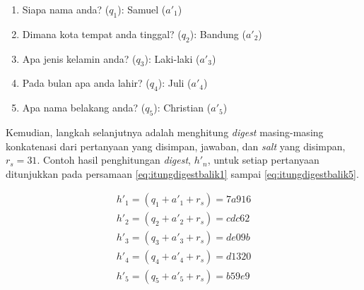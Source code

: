 \begin{enumerate}[itemsep=0mm]
	\item Siapa nama anda? (\begin{math}q_1\end{math}): Samuel (\begin{math}a'_1\end{math})
	\item Dimana kota tempat anda tinggal? (\begin{math}q_2\end{math}): Bandung (\begin{math}a'_2\end{math})
	\item Apa jenis kelamin anda? (\begin{math}q_3\end{math}): Laki-laki (\begin{math}a'_3\end{math})
	\item Pada bulan apa anda lahir? (\begin{math}q_4\end{math}): Juli (\begin{math}a'_4\end{math})
	\item Apa nama belakang anda? (\begin{math}q_5\end{math}): Christian (\begin{math}a'_5\end{math})
\end{enumerate}

Kemudian, langkah selanjutnya adalah menghitung \textit{digest} masing-masing konkatenasi dari pertanyaan yang disimpan, jawaban, dan \textit{salt} yang disimpan, \begin{math}r_s=31\end{math}. Contoh hasil penghitungan \textit{digest}, \begin{math}h'_n\end{math}, untuk setiap pertanyaan ditunjukkan pada persamaan \ref{eq:itungdigestbalik1} sampai \ref{eq:itungdigestbalik5}.

\begin{gather}
	h'_1 = (q_1 + a'_1 + r_s) = 7a916 \label{eq:itungdigestbalik1} \\
	h'_2 = (q_2 + a'_2 + r_s) = cdc62 \label{eq:itungdigestbalik2} \\
	h'_3 = (q_3 + a'_3 + r_s) = de09b \label{eq:itungdigestbalik3} \\
	h'_4 = (q_4 + a'_4 + r_s) = d1320 \label{eq:itungdigestbalik4} \\
	h'_5 = (q_5 + a'_5 + r_s) = b59e9 \label{eq:itungdigestbalik5}
\end{gather}

